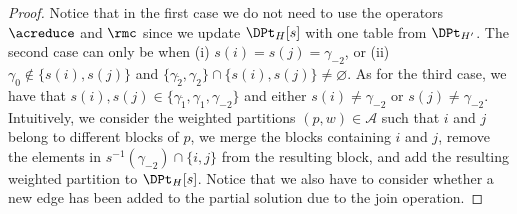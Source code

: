\begin{proof}
    Notice that in the first case we do not need to use the operators $\acreduce$ and $\rmc$ since we update
    $\DPt_H[s]$ with one table from $\DPt_{H'}$.
    The second case can only be when (i) $s(i)=s(j)=\gamma_{-2}$,
    or (ii) $\gamma_0 \notin \{s(i),s(j)\}$ and
    $\{\gamma_{\tilde{2}},\gamma_{2}\} \cap \{s(i),s(j)\} \neq \varnothing$.
    As for the third case, we have that $s(i),s(j) \in \{\gamma_{\tilde{1}}, \gamma_{1}, \gamma_{-2}\}$ and
    either $s(i) \neq \gamma_{-2}$ or $s(j) \neq \gamma_{-2}$.
    Intuitively, we consider the weighted partitions $(p,w) \in \mathcal{A}$ such that
    $i$ and $j$ belong to different blocks of $p$,
    we merge the blocks containing $i$ and $j$,
    remove the elements in $s^{-1}(\gamma_{-2}) \cap \{i,j\}$ from the resulting block,
    and add the resulting weighted partition to $\DPt_H[s]$.
    Notice that we also have to consider whether a new edge has been added to the partial solution due to the join operation.



\end{proof}

